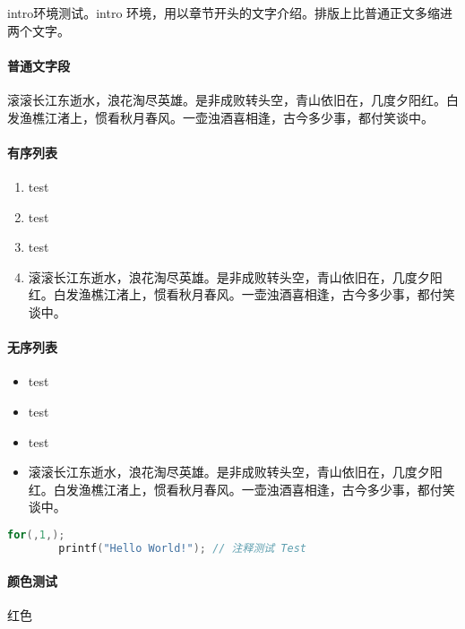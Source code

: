 \documentclass{resources/DocClass}
\begin{document}
    \begin{intro}
        intro环境测试。intro 环境，用以章节开头的文字介绍。排版上比普通正文多缩进两个文字。
    \end{intro}

    \paragraph{普通文字段} 滚滚长江东逝水，浪花淘尽英雄。是非成败转头空，青山依旧在，几度夕阳红。白发渔樵江渚上，惯看秋月春风。一壶浊酒喜相逢，古今多少事，都付笑谈中。

    \paragraph{有序列表}
    \begin{enumerate}[label={Step \arabic*.}]
        \item test
        \item test
        \item test
        \item 滚滚长江东逝水，浪花淘尽英雄。是非成败转头空，青山依旧在，几度夕阳红。白发渔樵江渚上，惯看秋月春风。一壶浊酒喜相逢，古今多少事，都付笑谈中。
    \end{enumerate}

    \paragraph{无序列表}
    \begin{itemize}
        \item test
        \item test
        \item test
        \item 滚滚长江东逝水，浪花淘尽英雄。是非成败转头空，青山依旧在，几度夕阳红。白发渔樵江渚上，惯看秋月春风。一壶浊酒喜相逢，古今多少事，都付笑谈中。
    \end{itemize}

    \begin{lstlisting}[language={C},title={\textsf{C语言代码段测试}}]
        for(,1,);
        printf("Hello World!"); // 注释测试 Test
    \end{lstlisting}

    \paragraph{\color{black}颜色测试}
    {\color{red} 红色}
\end{document}
